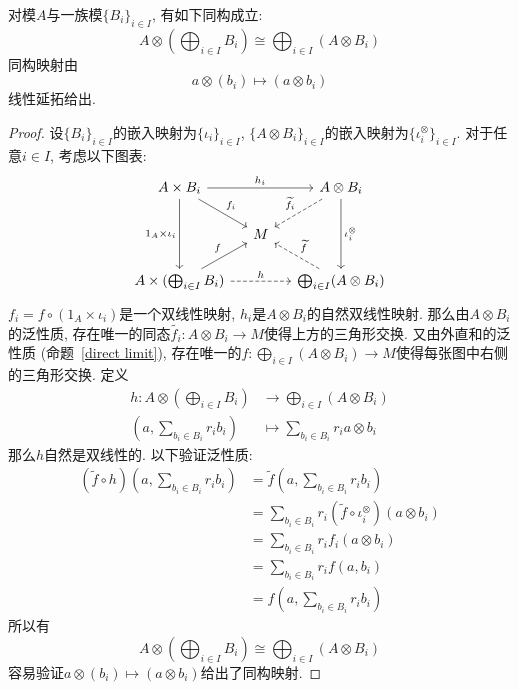 \begin{prop}[分配律]\label{distribution}
    对模$A$与一族模$\{B_i\}_{i\in I}$, 有如下同构成立:
    \[A\otimes\left(\bigoplus_{i\in I}B_i\right)\cong\bigoplus_{i\in I}(A\otimes B_i)\]
    同构映射由
    \[a\otimes(b_i)\mapsto(a\otimes b_i)\]
    线性延拓给出.
\end{prop}
\begin{proof}
    设$\{B_i\}_{i\in I}$的嵌入映射为$\{\iota_i\}_{i\in I}$, $\{A\otimes B_i\}_{i\in I}$的嵌入映射为$\{\iota^\otimes_i\}_{i\in I}$.
    对于任意$i\in I$, 考虑以下图表:
    \[\begin{tikzcd}[column sep=small]
        A\times B_i \arrow[dd, "1_A\times\iota_i"'] \arrow[dr, "f_i"] \arrow[rr, "h_i"] & &
        A\otimes B_i \arrow[dl, dashed, "\widetilde{f_i}"'] \arrow[dd, "\iota^\otimes_i"] \\
        & M & \\
        A\times(\bigoplus_{i\in I}B_i) \arrow[ur, "f"] \arrow[rr, dashed, "h"] & &
        \bigoplus_{i\in I}(A\otimes B_i) \arrow[ul, dashed, "\widetilde{f}"']
    \end{tikzcd}\]
    $f_i=f\circ(1_A\times\iota_i)$是一个双线性映射, $h_i$是$A\otimes B_i$的自然双线性映射.
    那么由$A\otimes B_i$的泛性质, 存在唯一的同态$\widetilde{f_i}:A\otimes B_i\to M$使得上方的三角形交换.
    又由外直和的泛性质 (命题~\ref{direct limit}), 存在唯一的$\displaystyle f:\bigoplus_{i\in I}(A\otimes B_i)\to M$使得每张图中右侧的三角形交换.
    定义
    \begin{align*}
        h:A\otimes\left(\bigoplus_{i\in I}B_i\right)&\to\bigoplus_{i\in I}(A\otimes B_i)\\
        \left(a,\sum_{b_i\in B_i}r_ib_i\right)&\mapsto\sum_{b_i\in B_i}r_ia\otimes b_i
    \end{align*}
    那么$h$自然是双线性的.
    以下验证泛性质:
    \begin{align*}
        (\widetilde{f}\circ h)\left(a,\sum_{b_i\in B_i}r_ib_i\right)&=\widetilde{f}\left(a,\sum_{b_i\in B_i}r_ib_i\right)\\
        &=\sum_{b_i\in B_i}r_i(\widetilde{f}\circ\iota_i^\otimes)(a\otimes b_i)\\
        &=\sum_{b_i\in B_i}r_if_i(a\otimes b_i)\\
        &=\sum_{b_i\in B_i}r_if(a,b_i)\\
        &=f\left(a,\sum_{b_i\in B_i}r_ib_i\right)
    \end{align*}
    所以有
    \[A\otimes\left(\bigoplus_{i\in I}B_i\right)\cong\bigoplus_{i\in I}(A\otimes B_i)\]
    容易验证$a\otimes(b_i)\mapsto(a\otimes b_i)$给出了同构映射.
\end{proof}

